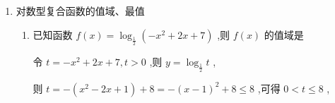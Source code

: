 \begin{enumerate}
\begin{enumerate}
    \item 设$F(x) = \dfrac{2^x}{a} - \dfrac{1}{2^x} + 2 - 2^{x-2} + \dfrac{a}{2^{x-2}}$，已知$F(x)$的最小值为$m$，且$m > 2 + \sqrt{7}$.求实数$a$的取值范围.
    \begin{jieda}
        $F(x) = \left(\dfrac{4-a}{4a}\right)\cdot2^x + \dfrac{(4a-1)}{2^x} + 2$，易知$a$会影响$F(x)$的单调性
        \begin{enumerate}
            \item $a \geq 4$ \\
            $\dfrac{4-a}{4a} \leq 0, (4a-1) > 0$，$F(x)$单调减，无最小值，不符合要求.
            \item $\dfrac{1}{4} < a < 4$ \\
            $\dfrac{4-a}{4a} > 0, (4a-1) > 0$，换元$t = 2^x (t > 0)$，则$F(x) = G(t) = \left(\dfrac{4-a}{4a}\right)t + \dfrac{(4a-1)}{t} + 2$为关于$t$的对勾函数的一支.因此$G(t) \geq 2\sqrt{\dfrac{(4-a)(4a-1)}{4a}}+2$，当$t = \sqrt{\dfrac{(4a-1)(4a)}{4-a}}$时取等号，\\
            故$2\sqrt{\dfrac{(4-a)(4a-1)}{4a}} > \sqrt{7}$，解得$a \in \left(\dfrac{1}{2}, 2\right)$ 
            \item $0 < a \leq \dfrac{1}{4}$ \\
            $\dfrac{4-a}{4a} > 0, (4a-1) \leq 0$，$F(x)$单调增，无最小值，不符合要求.
            \item $a = 0$\\
            $F(x)$无意义.
            \item $a < 0$ \\
            $\dfrac{4-a}{4a} < 0, (4a-1) < 0$，这种情况和第二种情况对称，此时只有最大值无最小值.
        \end{enumerate}
        综上，$a \in \left(\dfrac{1}{2}, 2\right)$
    \end{jieda}
    \end{enumerate}
    \item 对数型复合函数的值域、最值
    \begin{enumerate}
    \item 已知函数 $f\left( x\right)  = {\log }_{\frac{1}{2}}\left( {-{x}^{2} + {2x} + 7}\right)$ ,则 $f\left( x\right)$ 的值域是
    \begin{jieda}
        令 $t =  - {x}^{2} + {2x} + 7,t > 0$ ,则 $y = {\log }_{\frac{1}{2}}t$ ,
        
        则 $t =  - \left( {{x}^{2} - {2x} + 1}\right)  + 8 =  - {\left( x - 1\right) }^{2} + 8 \leq  8$ ,可得 $0 < t \leq  8$ ,
        

\end{jieda}
\end{enumerate}
\end{enumerate}
